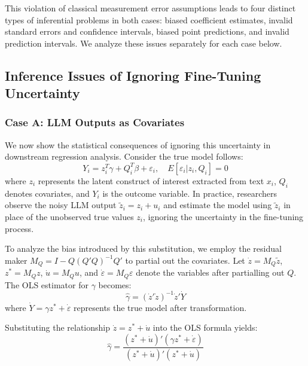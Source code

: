 \documentclass[11pt]{article}
\begin{document}
This violation of classical measurement error assumptions leads to four distinct types of inferential problems in both cases:
biased coefficient estimates, invalid standard errors and confidence intervals, biased point predictions, and invalid prediction intervals.
We analyze these issues separately for each case below.

\subsection{Inference Issues of Ignoring Fine-Tuning Uncertainty}

\subsubsection{Case A: LLM Outputs as Covariates}

We now show the statistical consequences of ignoring this uncertainty in downstream regression analysis.
Consider the true model follows:
\begin{equation}
Y_i = z_i^T\gamma + Q_i^T\beta + \varepsilon_i, \quad E[\varepsilon_i|z_i, Q_i] = 0
\end{equation}
where $z_i$ represents the latent construct of interest extracted from text $x_i$, $Q_i$ denotes covariates, and $Y_i$ is the outcome variable.
In practice, researchers observe the noisy LLM output $\tilde{z}_i = z_i + u_i$ and
estimate the model using $\tilde{z}_i$ in place of the unobserved true values $z_i$, ignoring the uncertainty in the fine-tuning process.

To analyze the bias introduced by this substitution, we employ the residual maker $M_Q = I - Q(Q'Q)^{-1}Q'$ to partial out the covariates. 
Let $\dot{z} = M_Q\tilde{z}$, $z^* = M_Q z$, $\dot{u} = M_Q u$, and $\dot{\varepsilon} = M_Q \varepsilon$ denote the variables after partialling out $Q$. The OLS estimator for $\gamma$ becomes:
\begin{equation}
\hat{\gamma} = (\dot{z}'\dot{z})^{-1}\dot{z}'\dot{Y}
\end{equation}
where $\dot{Y} = \gamma z^* + \dot{\varepsilon}$ represents the true model after transformation.

Substituting the relationship $\dot{z} = z^* + \dot{u}$ into the OLS formula yields:
\begin{equation}
\hat{\gamma} = \frac{(z^* + \dot{u})'(\gamma z^* + \dot{\varepsilon})}{(z^* + \dot{u})'(z^* + \dot{u})}
\end{equation}
\end{document}
